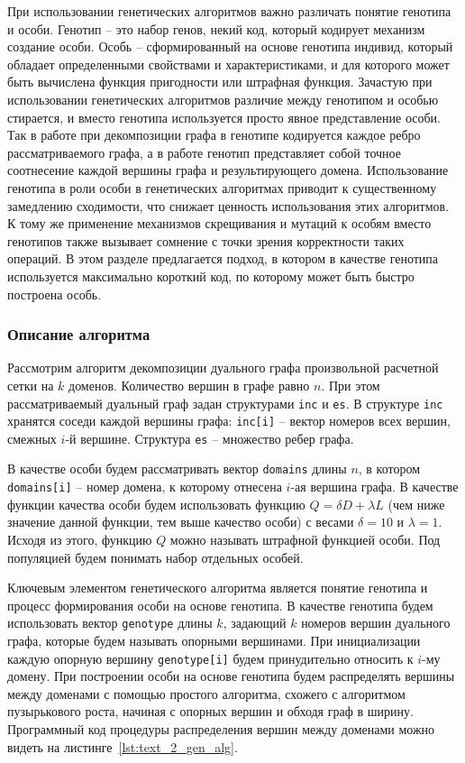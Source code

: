 При использовании генетических алгоритмов важно различать понятие генотипа и особи.
Генотип – это набор генов, некий код, который кодирует механизм создание особи.
Особь – сформированный на основе генотипа индивид, который обладает определенными свойствами и характеристиками, и для которого может быть вычислена функция пригодности или штрафная функция.
Зачастую при использовании генетических алгоритмов различие между генотипом и особью стирается, и вместо генотипа используется просто явное представление особи.
Так в работе \cite{Chaouche2023Graph} при декомпозиции графа в генотипе кодируется каждое ребро рассматриваемого графа, а в работе \cite{Li2020Graph} генотип представляет собой точное соотнесение каждой вершины графа и результирующего домена.
Использование генотипа в роли особи в генетических алгоритмах приводит к существенному замедлению сходимости, что снижает ценность использования этих алгоритмов.
К тому же применение механизмов скрещивания и мутаций к особям вместо генотипов также вызывает сомнение с точки зрения корректности таких операций.
В этом разделе предлагается подход, в котором в качестве генотипа используется максимально короткий код, по которому может быть быстро построена особь.

\subsubsection{Описание алгоритма}

Рассмотрим алгоритм декомпозиции дуального графа\label{term:dual_graph2} произвольной расчетной сетки на $k$ доменов.
Количество вершин в графе равно $n$.
При этом рассматриваемый дуальный граф задан структурами \texttt{inc} и \texttt{es}.
В структуре \texttt{inc} хранятся соседи каждой вершины графа: \texttt{inc[i]} -- вектор номеров всех вершин, смежных $i$-й вершине.
Структура \texttt{es} -- множество ребер графа.

В качестве особи будем рассматривать вектор \texttt{domains} длины $n$, в котором \texttt{domains[i]} -- номер домена\label{term:domain4}, к которому отнесена $i$-ая вершина графа.
В качестве функции качества особи будем использовать функцию $Q = \delta D + \lambda L$ (чем ниже значение данной функции, тем выше качество особи) с весами $\delta = 10$ и $\lambda = 1$.
Исходя из этого, функцию $Q$ можно называть штрафной функцией особи.
Под популяцией будем понимать набор отдельных особей.

Ключевым элементом генетического алгоритма является понятие генотипа и процесс формирования особи на основе генотипа.
В качестве генотипа будем использовать вектор \texttt{genotype} длины $k$, задающий $k$ номеров вершин дуального графа, которые будем называть опорными вершинами\label{term:opor_point}.
При инициализации каждую опорную вершину \texttt{genotype[i]} будем принудительно относить к $i$-му домену.
При построении особи на основе генотипа будем распределять вершины между доменами с помощью простого алгоритма, схожего с алгоритмом пузырькового роста, начиная с опорных вершин и обходя граф в ширину.
Программный код процедуры распределения вершин между доменами можно видеть на листинге~\ref{lst:text_2_gen_alg}.

